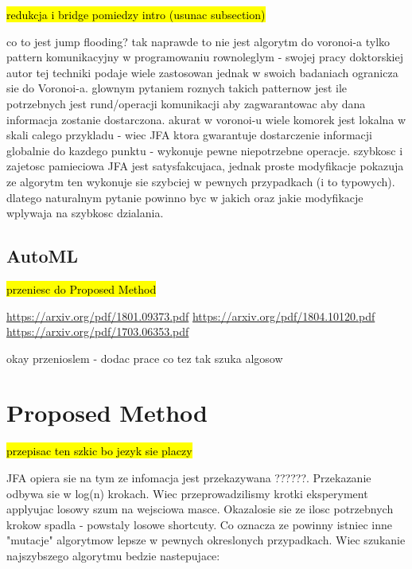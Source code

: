 \documentclass[format=acmsmall,screen,review,authordraft,nonacm]{acmart}
\begin{document}
\hl{redukcja i bridge pomiedzy intro (usunac subsection)}

co to jest jump flooding? tak naprawde to nie jest algorytm do voronoi-a tylko
pattern komunikacyjny w programowaniu rownoleglym - swojej pracy doktorskiej
autor tej techniki podaje wiele zastosowan jednak w swoich badaniach ogranicza
sie do Voronoi-a. glownym pytaniem roznych takich patternow jest ile potrzebnych
jest rund/operacji komunikacji aby zagwarantowac aby dana informacja zostanie
dostarczona. akurat w voronoi-u wiele komorek jest lokalna w skali calego
przykladu - wiec JFA ktora gwarantuje dostarczenie informacji globalnie do
kazdego punktu - wykonuje pewne niepotrzebne operacje.  szybkosc i zajetosc
pamieciowa JFA jest satysfakcujaca, jednak proste modyfikacje pokazuja ze
algorytm ten wykonuje sie szybciej w pewnych przypadkach (i to typowych).
dlatego naturalnym pytanie powinno byc w jakich oraz jakie modyfikacje wplywaja
na szybkosc dzialania.

\subsection{AutoML} %

\hl{przeniesc do Proposed Method}

\url{https://arxiv.org/pdf/1801.09373.pdf}
\url{https://arxiv.org/pdf/1804.10120.pdf}
\url{https://arxiv.org/pdf/1703.06353.pdf}

okay przenioslem - dodac prace co tez tak szuka algosow

\section{Proposed Method} %

\hl{przepisac ten szkic bo jezyk sie placzy}

JFA opiera sie na tym ze infomacja jest przekazywana ??????.  Przekazanie odbywa
sie w log(n) krokach. Wiec przeprowadzilismy krotki eksperyment applyujac losowy
szum na wejsciowa masce. Okazalosie sie ze ilosc potrzebnych krokow spadla -
powstaly losowe shortcuty.  Co oznacza ze powinny istniec inne "mutacje"
algorytmow lepsze w pewnych okreslonych przypadkach.  Wiec szukanie najszybszego
algorytmu bedzie nastepujace:
\end{document}
